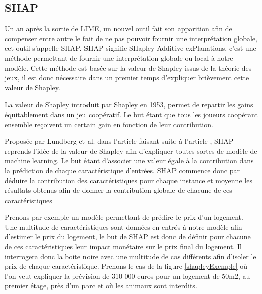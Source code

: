 \subsection{SHAP}
Un an après la sortie de LIME, un nouvel outil fait son apparition afin de compenser entre autre le fait de ne pas pouvoir fournir une interprétation globale, cet outil s'appelle SHAP. SHAP signifie SHapley Additive exPlanations, c'est une méthode permettant de fournir une interprétation globale ou local à notre modèle. Cette méthode est basée sur la valeur de Shapley issus de la théorie des jeux, il est donc nécessaire dans un premier temps d'expliquer brièvement cette valeur de Shapley.\par
La valeur de Shapley introduit par Shapley en 1953, permet de repartir les gains équitablement dans un jeu coopératif. Le but étant que tous les joueurs coopérant ensemble reçoivent un certain gain en fonction de leur contribution.\par
Proposée par Lundberg et al. dans l'article \cite{shapLast} faisant suite à l'article \cite{shapFirst}, SHAP reprends l'idée de la valeur de Shapley afin d'expliquer toutes sortes de modèle de machine learning. Le but étant d'associer une valeur égale à la contribution dans la prédiction de chaque caractéristique d'entrées. SHAP commence donc par déduire la contribution des caractéristiques pour chaque instance et moyenne les résultats obtenus afin de donner la contribution globale de chacune de ces caractéristiques\par
Prenons par exemple un modèle permettant de prédire le prix d'un logement. Une multitude de caractéristiques sont données en entrés à notre modèle afin d'estimer le prix du logement, le but de SHAP est donc de définir pour chacune de ces caractéristiques leur impact monétaire sur le prix final du logement. Il interrogera donc la boite noire avec une multitude de cas différents afin d'isoler le prix de chaque caractéristique. Prenons le cas de la figure \ref{shapleyExemple} où l'on veut expliquer la prévision de 310 000 euros pour un logement de 50m2, au premier étage, près d'un parc et où les animaux sont interdits.

